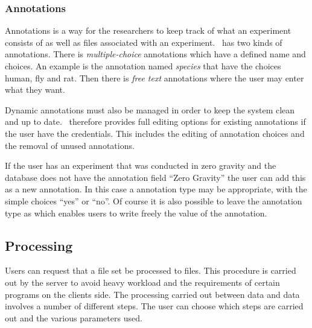 \subsubsection{Annotations}
Annotations is a way for the researchers to keep track of what an experiment consists of as well as files associated with an experiment.
\appName\ has two kinds of annotations. There is \textit{multiple-choice} annotations which have a defined name and choices. An example is the annotation named \textit{species} that have the choices human, fly and rat.
Then there is \textit{free text} annotations where the user may enter what they want.

Dynamic annotations must also be managed in order to keep the system clean and up to date. \appName\ therefore provides full editing options for existing annotations if the user have the credentials. This includes the editing of  annotation choices and the removal of unused annotations.

\begin{example}
If the user has an experiment that was conducted in zero gravity and the database does not have the annotation field ``Zero Gravity'' the user can add this as a new annotation. In this case a  annotation type may be appropriate, with the simple choices ``yes'' or ``no''. Of course it is also possible to leave the annotation type as  which enables users to write  freely the value of the annotation.
\end{example}

\subsection{Processing}
Users can request that a  file set be processed to  files. This procedure is carried out by the server to avoid heavy workload and the requirements of certain programs on the clients side. The processing carried out between  data and  data involves a number of different steps. The user can choose which steps are carried out and the various parameters used.
